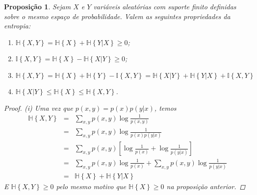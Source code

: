 \documentclass{amsart}
\theoremstyle{theorem}
\newtheorem{proposicao}{Proposi\c{c}\~{a}o}[section]
\theoremstyle{definition}
\theoremstyle{remark}
\numberwithin{equation}{section}
\newcommand{\HH}[1]{\mathbb{H}\left\{ #1 \right\}}
\newcommand{\II}[1]{\mathbb{I}\left\{ #1 \right\}}
\begin{document}
\begin{proposicao}
  Sejam $X$ e $Y$ vari\'{a}veis aleat\'{o}rias com suporte finito definidas sobre o mesmo espa\c{c}o de probabilidade. Valem as seguintes propriedades da entropia:
  \begin{enumerate}
    \item[(i)] $\HH{X,Y} = \HH{X} + \HH{Y|X}\geq 0$;
    \item[(ii)] $\II{X,Y} = \HH{X} - \HH{X|Y}\geq 0$;
    \item[(iii)] $\HH{X,Y} = \HH{X} + \HH{Y} - \II{X,Y} = \HH{X|Y} + \HH{Y|X} + \II{X,Y}$
    \item[(iv)] $ \HH{X|Y} \leq \HH{X}\leq \HH{X,Y}$.
  \end{enumerate}

  \begin{proof}
    (i) Uma vez que $p(x,y) = p(x)p(y|x)$, temos
    \begin{equation*}
    \begin{array}{rcl}
      \HH{X,Y} & = & \displaystyle \sum_{x,y} p(x,y) \log \frac{1}{p(x,y)} \\
        & = & \displaystyle \sum_{x,y} p(x,y) \log \frac{1}{p(x)p(y|x)} \\
        & = & \displaystyle \sum_{x,y} p(x,y) \left[\log \frac{1}{p(x)} + \log \frac{1}{p(y|x)}\right] \\
        & = & \displaystyle \sum_{x,y} p(x,y) \log \frac{1}{p(x)} + \sum_{x,y} p(x,y) \log \frac{1}{p(y|x)} \\
        & = & \HH{X} + \HH{Y|X}
    \end{array}
    \end{equation*}
    E $\HH{X,Y} \geq 0$ pelo mesmo motivo que $\HH{X} \geq0$ na proposi\c{c}\~{a}o anterior.


\end{proof}
\end{proposicao}
\end{document}

